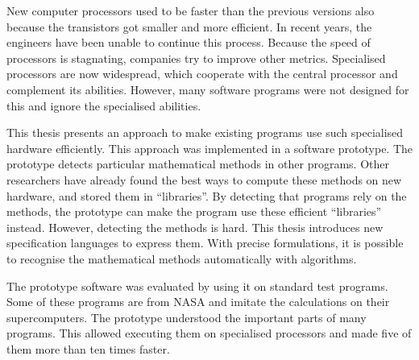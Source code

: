 
    New computer processors used to be faster than the previous versions also
    because the transistors got smaller and more efficient.
    In recent years, the engineers have been unable to continue this process.
    Because the speed of processors is stagnating, companies try to improve
    other metrics.
    Specialised processors are now widespread, which cooperate with the central
    processor and complement its abilities.
    However, many software programs were not designed for this and ignore the
    specialised abilities.

    This thesis presents an approach to make existing programs use such
    specialised hardware efficiently.
    This approach was implemented in a software prototype.
    The prototype detects particular mathematical methods in other programs.
    Other researchers have already found the best ways to compute these
    methods on new hardware, and stored them in ``libraries''.
    By detecting that programs rely on the methods, the prototype can make the
    program use these efficient ``libraries'' instead.
    However, detecting the methods is hard.
    This thesis introduces new specification languages to express them.
    With precise formulations, it is possible to recognise the mathematical
    methods automatically with algorithms.

    The prototype software was evaluated by using it on standard test programs.
    Some of these programs are from NASA and imitate the calculations on their
    supercomputers.
    The prototype understood the important parts of many programs.
    This allowed executing them on specialised processors and made five of them
    more than ten times faster.
